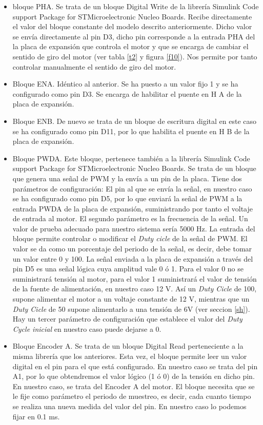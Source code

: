 \documentclass[10pt,a4paper]{report}
\begin{document}
\begin{itemize}
\item bloque PHA. Se trata de un bloque Digital Write de la librería Simulink Code support Package for STMicroelectronic Nucleo Boards. Recibe directamente el valor del bloque constante del modelo descrito anteriormente. Dicho valor se envía directamente al pin D3, dicho pin corresponde a la entrada PHA del la placa de expansión que controla el motor y que se encarga de cambiar el sentido de giro del motor (ver tabla \ref{t2} y figura \ref{f10}). Nos permite por tanto controlar manualmente el sentido de giro del motor.
\item Bloque ENA. Idéntico al anterior. Se ha puesto a un valor fijo 1 y se ha configurado como pin D3. Se encarga de habilitar el puente en H A de la placa de expansión.
\item Bloque ENB. De nuevo se trata de un bloque de escritura digital en este caso se ha configurado como pin D11, por lo que habilita el puente en H B de la placa de expansión.
\item Bloque PWDA. Este bloque, pertenece también a la librería Simulink Code support Package for STMicroelectronic Nucleo Boards. Se trata de un bloque que genera una señal de PWM y la envía a un pin de la placa. Tiene dos parámetros de configuración: El pin al que se envía la señal, en nuestro caso se ha configurado como pin D5, por lo que enviará la señal de PWM a la entrada PWDA de la placa de expansión, suministrando por tanto el voltaje de entrada al motor. El segundo parámetro es la frecuencia de la señal. Un valor de prueba adecuado para nuestro sistema sería 5000 Hz. La entrada del bloque permite controlar o modificar el \emph{Duty cicle} de la señal de PWM. El valor se da como un porcentaje del periodo de la señal, es decir, debe tomar un valor entre 0 y 100. La señal enviada a la placa de expansión a través del pin D5 es una señal lógica cuya amplitud vale 0 ó 1. Para el valor 0 no se suministrará tensión al motor, para el valor 1 suministrará el valor de tensión de la fuente de alimentación, en nuestro caso 12 V. Así un \emph{Duty Cicle} de 100, supone alimentar el motor a un voltaje constante de 12 V, mientras que un \emph{Duty Cicle} de 50 supone alimentarlo a una tensión de 6V (ver seccion \ref{sh}). Hay un tercer parámetro de configuración que establece el valor del \emph{Duty Cycle inicial} en nuestro caso puede dejarse a 0.

\item Bloque Encoder A. Se trata de un bloque Digital Read perteneciente a la misma librería que los anteriores. Esta vez, el bloque permite leer un valor digital en el pin para el que está configurado. En nuestro caso se trata del pin A1, por lo que obtendremos el valor lógico (1 ó 0) de la tensión en dicho pin. En nuestro caso, se trata del Encoder A  del motor. El bloque necesita que se le fije como parámetro el periodo de muestreo, es decir, cada cuanto tiempo se realiza una nueva medida del valor del pin.  En nuestro caso lo podemos fijar en 0.1 ms.


\end{itemize}
\end{document}
